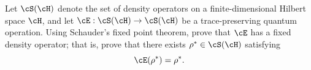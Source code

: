 Let $\cS(\cH)$ denote the set of density operators on a finite-dimensional Hilbert space $\cH$, and let $\cE:\cS(\cH)\to\cS(\cH)$ be a trace-preserving quantum operation. Using Schauder's fixed point theorem, prove that $\cE$ has a fixed density operator; that is, prove that there exists $\rho^*\in\cS(\cH)$ satisfying
$$
\cE(\rho^*)=\rho^*.
$$
